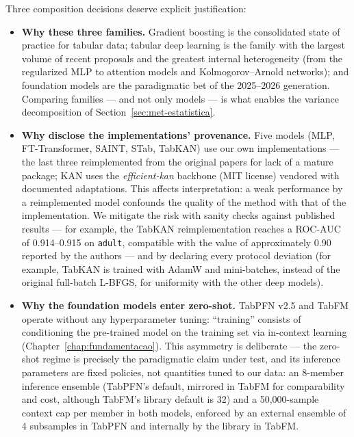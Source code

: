 Three composition decisions deserve explicit justification:

\begin{itemize}
  \item \textbf{Why these three families.} Gradient boosting is the
    consolidated state of practice for tabular data; tabular deep
    learning is the family with the largest volume of recent
    proposals and the greatest internal heterogeneity (from the
    regularized MLP to attention models and Kolmogorov--Arnold
    networks); and foundation models are the paradigmatic bet of the
    2025--2026 generation. Comparing families --- and not only
    models --- is what enables the variance decomposition of
    Section~\ref{sec:met-estatistica}.
  \item \textbf{Why disclose the implementations' provenance.} Five
    models (MLP, FT-Transformer, SAINT, STab, TabKAN) use our own
    implementations --- the last three reimplemented from the
    original papers for lack of a mature package; KAN uses the
    \emph{efficient-kan} backbone (MIT license) vendored with
    documented adaptations. This affects interpretation: a weak
    performance by a reimplemented model confounds the quality of
    the method with that of the implementation. We mitigate the risk
    with sanity checks against published results --- for example,
    the TabKAN reimplementation reaches a ROC-AUC of 0.914--0.915 on
    \texttt{adult}, compatible with the value of approximately 0.90
    reported by the authors \citep{tabkan2025} --- and by declaring
    every protocol deviation (for example, TabKAN is trained with
    AdamW and mini-batches, instead of the original full-batch
    L-BFGS, for uniformity with the other deep models).
  \item \textbf{Why the foundation models enter zero-shot.} TabPFN
    v2.5 and TabFM operate without any hyperparameter tuning:
    ``training'' consists of conditioning the pre-trained model on
    the training set via in-context learning
    (Chapter~\ref{chap:fundamentacao}). This asymmetry is deliberate
    --- the zero-shot regime is precisely the paradigmatic claim
    under test, and its inference parameters are fixed policies, not
    quantities tuned to our data: an 8-member inference ensemble
    (TabPFN's default, mirrored in TabFM for comparability and cost,
    although TabFM's library default is 32) and a 50{,}000-sample
    context cap per member in both models, enforced by an external
    ensemble of 4 subsamples in TabPFN and internally by the library
    in TabFM.
\end{itemize}

